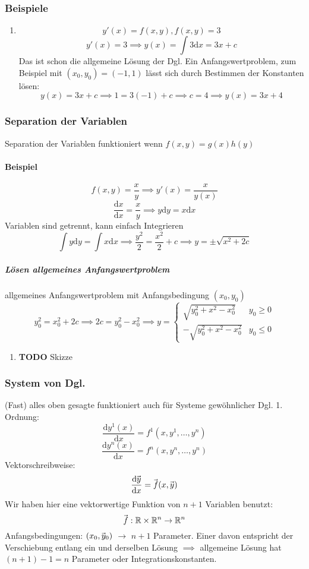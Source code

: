 \documentclass[a4paper]{scrartcl}
\renewcommand{\d}{\mathrm{d}}
\newcommand{\f}[2]{\frac{#1}{#2}}
\renewcommand{\v}[1]{\mathrlap{\vec{\mkern-2mu\phantom{#1}}}#1}
\theoremstyle{definition}
\theoremstyle{plain}
\theoremstyle{remark}
\theoremstyle{remark}
\begin{document}
\subsubsection{Beispiele}
\label{sec-3-3-5}
\begin{enumerate}
\item \[y'(x) = f(x,y), f(x,y) = 3\]
\[y'(x) = 3 \implies y(x) = \int 3\d x = 3 x + c\]
Das ist schon die allgemeine Lösung der Dgl.
Ein Anfangswertproblem, zum Beispiel mit $(x_0, y_0) = (-1,1)$ lässt sich durch Bestimmen der Konstanten lösen:
\[y(x) = 3 x + c \implies 1 = 3(-1) + c \implies c = 4 \implies y(x) = 3x + 4\]
\end{enumerate}
\subsubsection{Separation der Variablen}
\label{sec-3-3-6}
Separation der Variablen funktioniert wenn $f(x,y) = g(x)h(y)$
\paragraph{Beispiel}
\label{sec-3-3-6-1}
\[f(x,y) = \f{x}{y} \implies y'(x) = \f{x}{y(x)}\]
\[\f{\d x}{\d x} = \f{x}{y} \implies y\d y = x\d x\]
Variablen sind getrennt, kann einfach Integrieren
\[\int y\d y = \int x\d x \implies \f{y^2}{2} = \f{x^2}{2} + c \implies y = \pm \sqrt{x^2 + 2c}\]
\subparagraph{Lösen allgemeines Anfangswertproblem}
\label{sec-3-3-6-1-1}
allgemeines Anfangswertproblem mit Anfangsbedingung $(x_0,y_0)$
\[y_0^2 = x_0^2 + 2c \implies 2c = y_0^2 - x_0^2 \implies y = \begin{cases} \sqrt{y_0^2 + x^2 - x_0^2} & y_0 \geq 0 \\ -\sqrt{y_0^2 + x^2 - x_0^2} & y_0 \leq 0 \end{cases}\]
\begin{enumerate}
\item {\bfseries\sffamily TODO} Skizze
\label{sec-3-3-6-1-1-1}
\end{enumerate}
\subsubsection{System von Dgl.}
\label{sec-3-3-7}
(Fast) alles oben gesagte funktioniert auch für Systeme gewöhnlicher Dgl. 1. Ordnung:
\[\f{\d y^1(x)}{\d x} = f^1(x,y^1,\ldots,y^n)\]
\[\f{\d y^n(x)}{\d x} = f^n(x,y^n,\ldots,y^n)\]
Vektorschreibweise:
\[\f{\d \v y}{\d x} = \v f(x,\v y)\]
Wir haben hier eine vektorwertige Funktion von $n+1$ Variablen benutzt:
\[\v f:\mathbb{R}\times\mathbb{R}^n\to \mathbb{R}^n\]
Anfangsbedingungen: $(x_0,\v{y}_0)$ $\rightarrow$ $n+1$ Parameter. Einer davon entspricht der Verschiebung entlang ein und derselben Lösung $\implies$ allgemeine Lösung hat $(n + 1) - 1 = n$ Parameter oder Integrationskonstanten.
\end{document}

